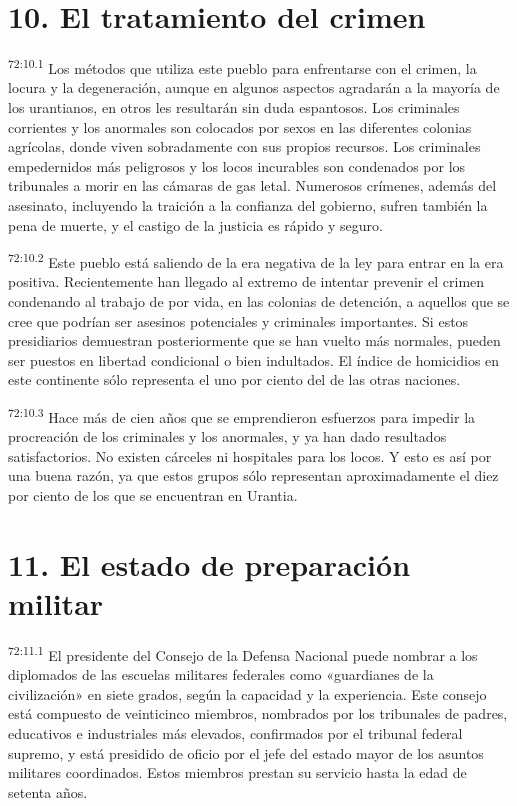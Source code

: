 \section*{10. El tratamiento del crimen}
\par
\textsuperscript{72:10.1} Los métodos que utiliza este pueblo para enfrentarse con el crimen, la locura y la degeneración, aunque en algunos aspectos agradarán a la mayoría de los urantianos, en otros les resultarán sin duda espantosos. Los criminales corrientes y los anormales son colocados por sexos en las diferentes colonias agrícolas, donde viven sobradamente con sus propios recursos. Los criminales empedernidos más peligrosos y los locos incurables son condenados por los tribunales a morir en las cámaras de gas letal. Numerosos crímenes, además del asesinato, incluyendo la traición a la confianza del gobierno, sufren también la pena de muerte, y el castigo de la justicia es rápido y seguro.

\par
\textsuperscript{72:10.2} Este pueblo está saliendo de la era negativa de la ley para entrar en la era positiva. Recientemente han llegado al extremo de intentar prevenir el crimen condenando al trabajo de por vida, en las colonias de detención, a aquellos que se cree que podrían ser asesinos potenciales y criminales importantes. Si estos presidiarios demuestran posteriormente que se han vuelto más normales, pueden ser puestos en libertad condicional o bien indultados. El índice de homicidios en este continente sólo representa el uno por ciento del de las otras naciones.

\par
\textsuperscript{72:10.3} Hace más de cien años que se emprendieron esfuerzos para impedir la procreación de los criminales y los anormales, y ya han dado resultados satisfactorios. No existen cárceles ni hospitales para los locos. Y esto es así por una buena razón, ya que estos grupos sólo representan aproximadamente el diez por ciento de los que se encuentran en Urantia.

\section*{11. El estado de preparación militar}
\par
\textsuperscript{72:11.1} El presidente del Consejo de la Defensa Nacional puede nombrar a los diplomados de las escuelas militares federales como «guardianes de la civilización» en siete grados, según la capacidad y la experiencia. Este consejo está compuesto de veinticinco miembros, nombrados por los tribunales de padres, educativos e industriales más elevados, confirmados por el tribunal federal supremo, y está presidido de oficio por el jefe del estado mayor de los asuntos militares coordinados. Estos miembros prestan su servicio hasta la edad de setenta años.

